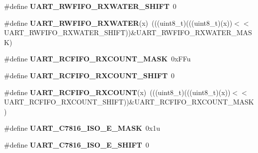 \begin{DoxyCompactItemize}
\item 
\#define {\bfseries U\+A\+R\+T\+\_\+\+R\+W\+F\+I\+F\+O\+\_\+\+R\+X\+W\+A\+T\+E\+R\+\_\+\+S\+H\+I\+FT}~0\hypertarget{group__UART__Register__Masks_ga76a2717965f398da28aadbbebfafa2c8}{}\label{group__UART__Register__Masks_ga76a2717965f398da28aadbbebfafa2c8}

\item 
\#define {\bfseries U\+A\+R\+T\+\_\+\+R\+W\+F\+I\+F\+O\+\_\+\+R\+X\+W\+A\+T\+ER}(x)~(((uint8\+\_\+t)(((uint8\+\_\+t)(x))$<$$<$U\+A\+R\+T\+\_\+\+R\+W\+F\+I\+F\+O\+\_\+\+R\+X\+W\+A\+T\+E\+R\+\_\+\+S\+H\+I\+FT))\&U\+A\+R\+T\+\_\+\+R\+W\+F\+I\+F\+O\+\_\+\+R\+X\+W\+A\+T\+E\+R\+\_\+\+M\+A\+SK)\hypertarget{group__UART__Register__Masks_ga76c4f184df06a869746af551b84e5105}{}\label{group__UART__Register__Masks_ga76c4f184df06a869746af551b84e5105}

\item 
\#define {\bfseries U\+A\+R\+T\+\_\+\+R\+C\+F\+I\+F\+O\+\_\+\+R\+X\+C\+O\+U\+N\+T\+\_\+\+M\+A\+SK}~0x\+F\+Fu\hypertarget{group__UART__Register__Masks_gad56c1815bb877b0a82dcabc58b780b54}{}\label{group__UART__Register__Masks_gad56c1815bb877b0a82dcabc58b780b54}

\item 
\#define {\bfseries U\+A\+R\+T\+\_\+\+R\+C\+F\+I\+F\+O\+\_\+\+R\+X\+C\+O\+U\+N\+T\+\_\+\+S\+H\+I\+FT}~0\hypertarget{group__UART__Register__Masks_gaf167fbdec63bf8287e0c1fa12ad7f39f}{}\label{group__UART__Register__Masks_gaf167fbdec63bf8287e0c1fa12ad7f39f}

\item 
\#define {\bfseries U\+A\+R\+T\+\_\+\+R\+C\+F\+I\+F\+O\+\_\+\+R\+X\+C\+O\+U\+NT}(x)~(((uint8\+\_\+t)(((uint8\+\_\+t)(x))$<$$<$U\+A\+R\+T\+\_\+\+R\+C\+F\+I\+F\+O\+\_\+\+R\+X\+C\+O\+U\+N\+T\+\_\+\+S\+H\+I\+FT))\&U\+A\+R\+T\+\_\+\+R\+C\+F\+I\+F\+O\+\_\+\+R\+X\+C\+O\+U\+N\+T\+\_\+\+M\+A\+SK)\hypertarget{group__UART__Register__Masks_gab386960a2ffd4a878651b2b8072c2756}{}\label{group__UART__Register__Masks_gab386960a2ffd4a878651b2b8072c2756}

\item 
\#define {\bfseries U\+A\+R\+T\+\_\+\+C7816\+\_\+\+I\+S\+O\+\_\+E\+\_\+\+M\+A\+SK}~0x1u\hypertarget{group__UART__Register__Masks_gae34238a46464deaac39303c8b11431a2}{}\label{group__UART__Register__Masks_gae34238a46464deaac39303c8b11431a2}

\item 
\#define {\bfseries U\+A\+R\+T\+\_\+\+C7816\+\_\+\+I\+S\+O\+\_\+E\+\_\+\+S\+H\+I\+FT}~0\hypertarget{group__UART__Register__Masks_gaee54546d1f78919cbcae5b7a5ec44f17}{}\label{group__UART__Register__Masks_gaee54546d1f78919cbcae5b7a5ec44f17}


\end{DoxyCompactItemize}

